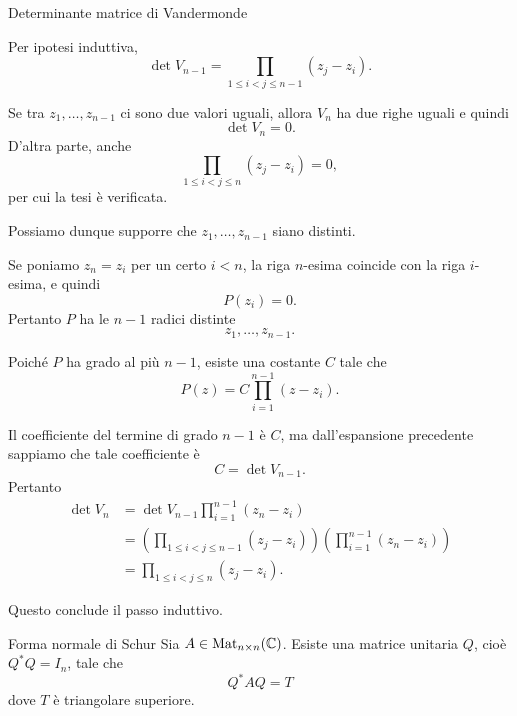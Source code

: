 \documentclass[a4paper]{article}
\begin{document}
\begin{snippetproof}{Determinante matrice di Vandermonde}
\begin{enumerate}
        Per ipotesi induttiva,
        \[
            \det V_{n-1}
            =
            \prod_{1 \leq i < j \leq n-1}(z_j-z_i).
        \]

        Se tra \(z_1,\dots,z_{n-1}\) ci sono due valori uguali, allora
        \(V_n\) ha due righe uguali e quindi
        \[
            \det V_n=0.
        \]
        D'altra parte, anche
        \[
            \prod_{1 \leq i < j \leq n}(z_j-z_i)=0,
        \]
        per cui la tesi è verificata.

        Possiamo dunque supporre che
        \(z_1,\dots,z_{n-1}\) siano distinti.

        Se poniamo \(z_n=z_i\) per un certo \(i<n\), la riga \(n\)-esima
        coincide con la riga \(i\)-esima, e quindi
        \[
            P(z_i)=0.
        \]
        Pertanto \(P\) ha le \(n-1\) radici distinte
        \[
            z_1,\dots,z_{n-1}.
        \]

        Poiché \(P\) ha grado al più \(n-1\), esiste una costante \(C\) tale che
        \[
            P(z)
            =
            C\prod_{i=1}^{n-1}(z-z_i).
        \]

        Il coefficiente del termine di grado \(n-1\) è \(C\), ma dall'espansione
        precedente sappiamo che tale coefficiente è
        \[
            C=\det V_{n-1}.
        \]
        Pertanto
        \[
            \begin{aligned}
                \det V_n
                &=
                \det V_{n-1}
                \prod_{i=1}^{n-1}(z_n-z_i) \\
                &=
                \left(
                    \prod_{1 \leq i < j \leq n-1}(z_j-z_i)
                \right)
                \left(
                    \prod_{i=1}^{n-1}(z_n-z_i)
                \right) \\
                &=
                \prod_{1 \leq i < j \leq n}(z_j-z_i).
            \end{aligned}
        \]

        Questo conclude il passo induttivo.
    \end{enumerate}
\end{snippetproof}

\begin{snippettheorem}{Forma normale di Schur}
    Sia \(A \in \operatorname{Mat}_{n \times n}(\mathbb{C})\).
    Esiste una matrice unitaria \(Q\), cioè \(Q^*Q=I_n\), tale che
    \[
        Q^*AQ = T
    \]
    dove \(T\) è triangolare superiore.
\end{snippettheorem}
\end{document}
